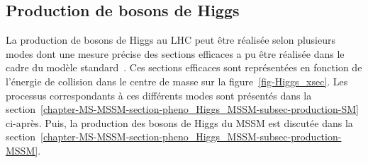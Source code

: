 \subsection{Production de bosons de Higgs}\label{chapter-MS-MSSM-section-pheno_Higgs_MSSM-subsec-production}
La production de bosons de Higgs au LHC peut être réalisée selon plusieurs modes dont une mesure précise des sections efficaces a pu être réalisée dans le cadre du modèle standard~\cite{Higgs_xsec_book_1,Higgs_xsec_book_2,Higgs_xsec_book_3,Higgs_xsec_book_4}.
Ces sections efficaces sont représentées en fonction de l'énergie de collision dans le centre de masse sur la figure~\ref{fig-Higgs_xsec}.
Les processus correspondants à ces différents modes sont présentés dans la section~\ref{chapter-MS-MSSM-section-pheno_Higgs_MSSM-subsec-production-SM} ci-après.
Puis, la production des bosons de Higgs du MSSM est discutée dans la section~\ref{chapter-MS-MSSM-section-pheno_Higgs_MSSM-subsec-production-MSSM}.
